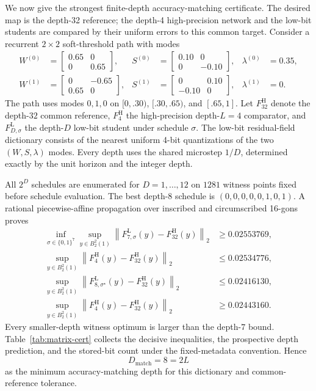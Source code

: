 \documentclass[twoside,11pt]{article}
\newcommand{\norm}[1]{\left\lVert #1\right\rVert}
\begin{document}
We now give the strongest finite-depth accuracy-matching certificate.  The desired map is the depth-32 reference; the depth-4 high-precision network and the low-bit students are compared by their uniform errors to this common target.  Consider a recurrent $2\times2$ soft-threshold path with modes
\begin{align}
W^{(0)}&=\begin{bmatrix}0.65&0\\0&0.65\end{bmatrix},
&S^{(0)}&=\begin{bmatrix}0.10&0\\0&-0.10\end{bmatrix},
&\lambda^{(0)}&=0.35,\\
W^{(1)}&=\begin{bmatrix}0&-0.65\\0.65&0\end{bmatrix},
&S^{(1)}&=\begin{bmatrix}0&0.10\\-0.10&0\end{bmatrix},
&\lambda^{(1)}&=0.
\end{align}
The path uses modes $0,1,0$ on $[0,.30)$, $[.30,.65)$, and $[.65,1]$.  Let $F_{32}^{\mathrm H}$ denote the depth-$32$ common reference, $F_4^{\mathrm H}$ the high-precision depth-$L=4$ comparator, and $F_{D,\sigma}^{\mathrm L}$ the depth-$D$ low-bit student under schedule $\sigma$.  The low-bit residual-field dictionary consists of the nearest uniform 4-bit quantizations of the two $(W,S,\lambda)$ modes.  Every depth uses the shared microstep $1/D$, determined exactly by the unit horizon and the integer depth.

All $2^D$ schedules are enumerated for $D=1,\ldots,12$ on $1281$ witness points fixed before schedule evaluation.  The best depth-$8$ schedule is $(0,0,0,0,0,1,0,1)$.  A rational piecewise-affine propagation over inscribed and circumscribed 16-gons proves
\begin{align}
  \inf_{\sigma\in\{0,1\}^7}\sup_{y\in B_2^2(1)}
  \norm{F_{7,\sigma}^{\mathrm L}(y)-F_{32}^{\mathrm H}(y)}_2
  &\ge 0.02553769,\\
  \sup_{y\in B_2^2(1)}\norm{F_4^{\mathrm H}(y)-F_{32}^{\mathrm H}(y)}_2
  &\le 0.02534776,\label{eq:D7-fail}\\[.2em]
  \sup_{y\in B_2^2(1)}\norm{F_{8,\sigma^\star}^{\mathrm L}(y)-F_{32}^{\mathrm H}(y)}_2
  &\le 0.02416130,\\
  \sup_{y\in B_2^2(1)}\norm{F_4^{\mathrm H}(y)-F_{32}^{\mathrm H}(y)}_2
  &\ge 0.02443160.\label{eq:D8-win}
\end{align}
Every smaller-depth witness optimum is larger than the depth-$7$ bound.  Table~\ref{tab:matrix-cert} collects the decisive inequalities, the prospective depth prediction, and the stored-bit count under the fixed-metadata convention.  Hence
\begin{equation}
  \boxed{D_{\mathrm{match}}=8=2L}
  \label{eq:exact-2L}
\end{equation}
as the minimum accuracy-matching depth for this dictionary and common-reference tolerance.
\end{document}
